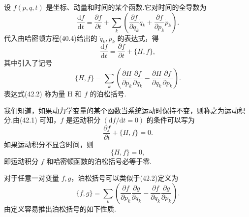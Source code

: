 设 $f(p,q,t)$ 是坐标、动量和时间的某个函数.它对时间的全导数为
\begin{equation*}
  \frac{\mathrm{d}f}{\mathrm{d}t}
  =\frac{\partial f}{\partial t}
  +\sum_k\left(\frac{\partial f}{\partial q_k}\dot{q}_k
  +\frac{\partial f}{\partial p_k}\dot{p}_k\right).
\end{equation*}
代入由哈密顿方程(40.4)给出的 $\dot{q}_k,\dot{p}_k$ 的表达式，得
\begin{equation}
  \frac{\mathrm{d}f}{\mathrm{d}t}
  =\frac{\partial f}{\partial t}+\{H,f\},
\end{equation}
其中引入了记号
\begin{equation}
  \{H,f\}=\sum_k\left(\frac{\partial H}{\partial p_k}
  \frac{\partial f}{\partial q_k}
  -\frac{\partial H}{\partial q_k}\frac{\partial f}{\partial p_k}\right).
\end{equation}
表达式(42.2) 称为量 H 和 $f$ 的泊松括号.

我们知道，如果动力学变量的某个函数当系统运动时保持不变，则称之为运动积分.由(42.1)
可知，$f$ 是运动积分 $\left(\mathrm{d}f/\mathrm{d}t=0\right)$ 的条件可以写为
\begin{equation}
  \frac{\partial f}{\partial t}+\{H,f\}=0.
\end{equation}
如果运动积分不显含时间，则
\begin{equation}
  \{H,f\}=0,
\end{equation}
即运动积分 $f$ 和哈密顿函数的泊松括号必等于零.

对于任意一对变量 $f,g$，泊松括号可以类似于(42.2)定义为
\begin{equation}
  \{f,g\}=\sum_k\left(\frac{\partial f}{\partial p_k}
  \frac{\partial g}{\partial q_k}
  -\frac{\partial f}{\partial q_k}\frac{\partial g}{\partial p_k}\right).
\end{equation}
由定义容易推出泊松括号的如下性质.

